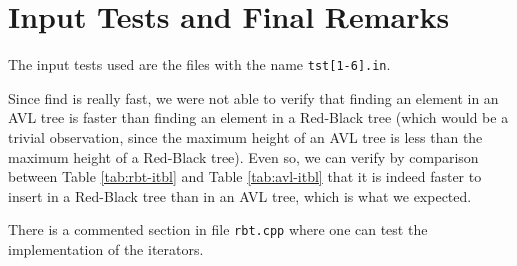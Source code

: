 \documentclass[12pt,a4paper,oneside]{article}
\theoremstyle{definition}
\begin{document}

\section{Input Tests and Final Remarks}\label{sec:input_final}

The input tests used are the files with the name \texttt{tst[1-6].in}.

Since find is really fast, we were not able to verify that finding an element in an AVL tree is faster than finding an element in a Red-Black tree (which would be a trivial observation, since the maximum height of an AVL tree is less than the maximum height of a Red-Black tree). Even so, we can verify by comparison between Table \ref{tab:rbt-itbl} and Table \ref{tab:avl-itbl} that it is indeed faster to insert in a Red-Black tree than in an AVL tree, which is what we expected.

There is a commented section in file \texttt{rbt.cpp} where one can test the implementation of the iterators.
\end{document}
